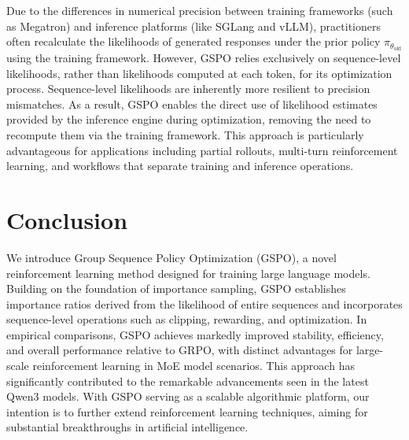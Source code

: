Due to the differences in numerical precision between training frameworks (such as Megatron) and inference platforms (like SGLang and vLLM), practitioners often recalculate the likelihoods of generated responses under the prior policy $\pi_{\theta_\text{old}}$ using the training framework. However, GSPO relies exclusively on sequence-level likelihoods, rather than likelihoods computed at each token, for its optimization process. Sequence-level likelihoods are inherently more resilient to precision mismatches. As a result, GSPO enables the direct use of likelihood estimates provided by the inference engine during optimization, removing the need to recompute them via the training framework. This approach is particularly advantageous for applications including partial rollouts, multi-turn reinforcement learning, and workflows that separate training and inference operations.

\section{Conclusion}

We introduce Group Sequence Policy Optimization (GSPO), a novel reinforcement learning method designed for training large language models. Building on the foundation of importance sampling, GSPO establishes importance ratios derived from the likelihood of entire sequences and incorporates sequence-level operations such as clipping, rewarding, and optimization. In empirical comparisons, GSPO achieves markedly improved stability, efficiency, and overall performance relative to GRPO, with distinct advantages for large-scale reinforcement learning in MoE model scenarios. This approach has significantly contributed to the remarkable advancements seen in the latest Qwen3 models. With GSPO serving as a scalable algorithmic platform, our intention is to further extend reinforcement learning techniques, aiming for substantial breakthroughs in artificial intelligence.

